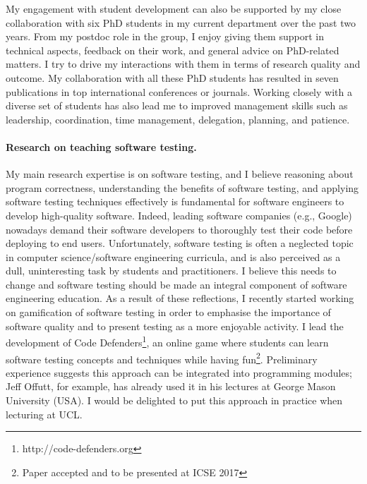 \documentclass[a4paper]{article}
\begin{document}
My engagement with student development can also be supported by my
close collaboration with six PhD students in my current department
over the past two years. From my postdoc role in the group, I enjoy
giving them support in technical aspects, feedback on their work, and
general advice on PhD-related matters. I try to drive my interactions
with them in terms of research quality and outcome. My collaboration
with all these PhD students has resulted in seven publications in top
international conferences or journals. Working closely with a diverse
set of students has also lead me to improved management skills such as
leadership, coordination, time management, delegation, planning, and
patience.

\paragraph{Research on teaching software testing.} My main research
expertise is on software testing, and I believe reasoning about
program correctness, understanding the benefits of software testing,
and applying software testing techniques effectively is fundamental
for software engineers to develop high-quality software. Indeed,
leading software companies (e.g., Google) nowadays demand their
software developers to thoroughly test their code before deploying to
end users.  Unfortunately, software testing is often a neglected topic
in computer science/software engineering curricula, and is also
perceived as a dull, uninteresting task by students and
practitioners. I believe this needs to change and software testing
should be made an integral component of software engineering
education. As a result of these reflections, I recently started
working on gamification of software testing in order to emphasise the
importance of software quality and to present testing as a more
enjoyable activity. I lead the development of Code
Defenders\footnote{http://code-defenders.org}, an online game where
students can learn software testing concepts and techniques while
having fun\footnote{Paper accepted and to be presented at ICSE
  2017}. Preliminary experience suggests this approach can be
integrated into programming modules; Jeff Offutt, for example, has
already used it in his lectures at George Mason University (USA). I
would be delighted to put this approach in practice when lecturing at
UCL.

\end{document}
